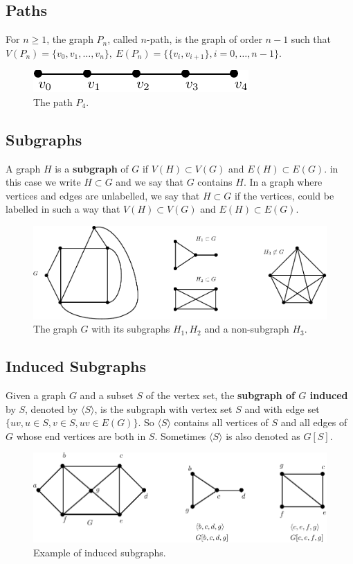 \documentclass[12pt,a4paper]{article}
\theoremstyle{definition}
\begin{document}
\subsection{Paths} For $n \geq 1$, the graph $P_n$, called $n$-path, is the graph of order $n-1$ such that $V(P_n)= \{ v_0,  v_1, \dots , v_n \}, \ E(P_n)= \{ \{ v_i, v_{i+1}\} , i = 0, \dots , n-1 \}$. 
\begin{figure}[hbtp]
\centering
\includegraphics[scale=1]{images/graph14.pdf}
\caption{The path $P_4$.}
\end{figure}
\newpage
\subsection{Subgraphs}
A graph $H$ is a \textbf{subgraph} of $G$ if $V(H) \subset V(G)$ and $E(H) \subset E(G)$. in this case we write $H \subset G$ and we say that $G$ contains $H$. In a graph where vertices and edges are unlabelled, we say that $H \subset G$ if the vertices, could be labelled  in such a way that $V(H) \subset V(G)$ and $E(H) \subset E(G)$. 
\begin{figure}[hbtp]
\centering
\includegraphics[scale=.8]{images/graph15.pdf}
\caption{The graph $G$ with its subgraphs $H_1, H_2$ and a non-subgraph $H_3$.}
\end{figure}
\subsection{Induced Subgraphs} Given a graph $G$ and a subset $S$ of the vertex set, the \textbf{subgraph of $G$ induced} by $S$, denoted by $\langle S \rangle$, is the subgraph with vertex set $S$ and with edge set $\{uv, u \in S, v \in S, uv \in E(G) \}.$ So $\langle S \rangle$ contains all vertices of $S$ and all edges of $G$ whose end vertices are both in $S$. Sometimes $\langle S \rangle$ is also denoted as $G[S]$. 
\begin{figure}[hbtp]
\centering
\includegraphics[scale=1]{images/graph16.pdf}
\caption{Example of induced subgraphs.}
\end{figure}
\newpage
\end{document}
